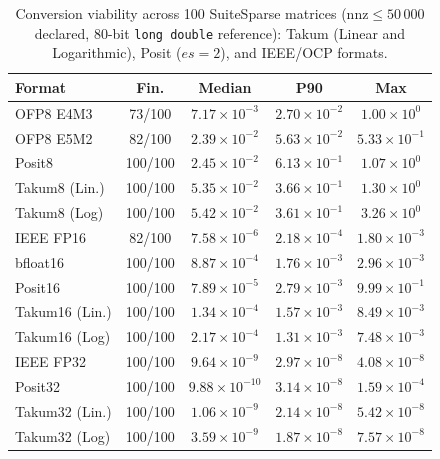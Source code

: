\begin{table}[t]
\caption{Conversion viability across 100 SuiteSparse matrices ($\mathrm{nnz} \le 50\,000$ declared, 80-bit \texttt{long double} reference): Takum (Linear and Logarithmic), Posit ($es=2$), and IEEE/OCP formats.}
\label{tab:suitesparse100}
\centering
\scriptsize
\setlength{\tabcolsep}{3.0pt}
\renewcommand{\arraystretch}{0.95}
\begin{tabular}{@{}lcccc@{}}
\toprule
Format & Fin. & Median & P90 & Max \\
\midrule
OFP8 E4M3 & 73/100 & $7.17 \times 10^{-3}$ & $2.70 \times 10^{-2}$ & $1.00 \times 10^{0}$ \\
OFP8 E5M2 & 82/100 & $2.39 \times 10^{-2}$ & $5.63 \times 10^{-2}$ & $5.33 \times 10^{-1}$ \\
Posit8 & 100/100 & $2.45 \times 10^{-2}$ & $6.13 \times 10^{-1}$ & $1.07 \times 10^{0}$ \\
Takum8 (Lin.) & 100/100 & $5.35 \times 10^{-2}$ & $3.66 \times 10^{-1}$ & $1.30 \times 10^{0}$ \\
Takum8 (Log) & 100/100 & $5.42 \times 10^{-2}$ & $3.61 \times 10^{-1}$ & $3.26 \times 10^{0}$ \\
\midrule
IEEE FP16 & 82/100 & $7.58 \times 10^{-6}$ & $2.18 \times 10^{-4}$ & $1.80 \times 10^{-3}$ \\
bfloat16 & 100/100 & $8.87 \times 10^{-4}$ & $1.76 \times 10^{-3}$ & $2.96 \times 10^{-3}$ \\
Posit16 & 100/100 & $7.89 \times 10^{-5}$ & $2.79 \times 10^{-3}$ & $9.99 \times 10^{-1}$ \\
Takum16 (Lin.) & 100/100 & $1.34 \times 10^{-4}$ & $1.57 \times 10^{-3}$ & $8.49 \times 10^{-3}$ \\
Takum16 (Log) & 100/100 & $2.17 \times 10^{-4}$ & $1.31 \times 10^{-3}$ & $7.48 \times 10^{-3}$ \\
\midrule
IEEE FP32 & 100/100 & $9.64 \times 10^{-9}$ & $2.97 \times 10^{-8}$ & $4.08 \times 10^{-8}$ \\
Posit32 & 100/100 & $9.88 \times 10^{-10}$ & $3.14 \times 10^{-8}$ & $1.59 \times 10^{-4}$ \\
Takum32 (Lin.) & 100/100 & $1.06 \times 10^{-9}$ & $2.14 \times 10^{-8}$ & $5.42 \times 10^{-8}$ \\
Takum32 (Log) & 100/100 & $3.59 \times 10^{-9}$ & $1.87 \times 10^{-8}$ & $7.57 \times 10^{-8}$ \\
\bottomrule
\end{tabular}
\end{table}
